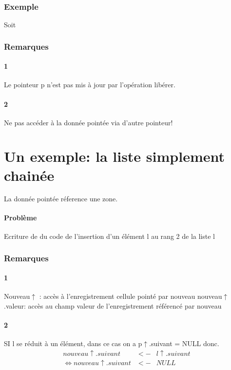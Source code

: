 		\subsubsection{Exemple}	
			Soit\\ 
			
				
		\subsubsection{Remarques}
			\paragraph{1}
				Le pointeur p n'est pas mis à jour par l'opération libérer.
			\paragraph{2}
				Ne pas accéder à la donnée pointée via d'autre pointeur!
\section{Un exemple: la liste simplement chainée}
	La donnée pointée réference une zone.
	
		
	\paragraph{Problème}
		Ecriture de du code de l'insertion d'un élément l au rang 2 de la liste l\\
		
	
	\subsubsection{Remarques}
		\paragraph{1}
			Nouveau$\uparrow$ : accès à l'enregistrement cellule pointé par nouveau
			nouveau$\uparrow$.valeur: accès au champ valeur de l'enregistrement référencé par nouveau
		\paragraph{2}
			SI l se réduit à un élément, dans ce cas on a p$\uparrow$.suivant = NULL donc. 
			\begin{eqnarray*}
				nouveau\uparrow. suivant &<-& l\uparrow. suivant \\\Leftrightarrow 
				nouveau\uparrow. suivant &<-& NULL
			\end{eqnarray*} 

